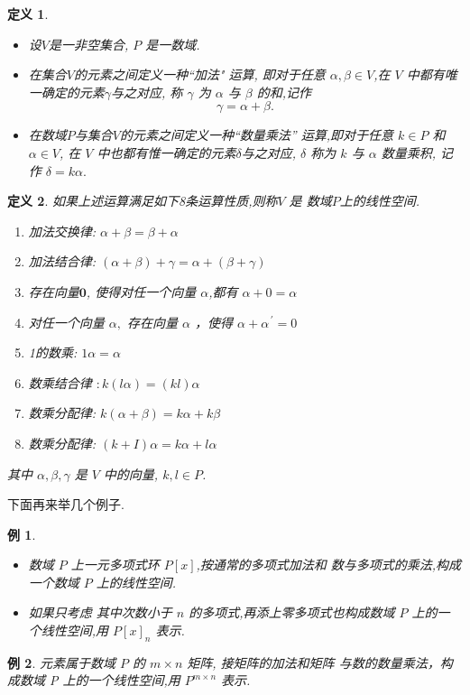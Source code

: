 \documentclass[13pt]{beamer}
\newtheorem{exa}{例}
\newtheorem*{defi}{定义}
\def\0{\mathbf{0}}
\def\a{\alpha}
\begin{document}
\begin{frame}

\begin{defi}
\begin{itemize}
\item 设$V$是一非空集合, $P$ 是一数域.
\item 在集合$V$的元素之间定义一种“\alert{加法}" 运算, 即对于任意 $\alpha, \beta \in V$,在 $V$ 中都有唯一确定的元素$\gamma$与之对应, 称 $\gamma$ 为 $\alpha$ 与 $\beta$ 的和,记作
\[
\gamma=\alpha+\beta.
\]

\item 在数域$P$与集合$V$的元素之间定义一种``\alert{数量乘法}'' 运算,即对于任意 $k \in P$ 和 $\a \in V$, 在 $V$ 中也都有惟一确定的元素$\delta$与之对应, $\delta$ 称为 $k$ 与 $\alpha$ 数量乘积, 记作 $\delta={k} \alpha.$
\end{itemize}
\end{defi}
\end{frame}


\begin{frame}
\begin{defi}

如果上述运算满足如下8条运算性质,则称$V$ 是 数域$P$上的\alert{线性空间}.	
\begin{enumerate}
	\item 加法交换律: $\alpha+\beta=\beta+\alpha$
	\item 加法结合律: $(\alpha+\beta)+\gamma=\alpha+(\beta+\gamma)$
	\item 存在向量$\0$, 使得对任一个向量 $\alpha$,都有 $\alpha+{0}=\alpha$
	\item 对任一个向量 $\alpha,$ 存在向量 $\alpha$ ，使得 $\alpha+\alpha^{\, \prime}={0}$
	\item 1的数乘: $1 \alpha=\alpha$
	\item 数乘结合律 $: k(l \alpha)=(k l) \alpha$
	\item 数乘分配律: $k(\alpha+\beta)=k \alpha+k \beta$
	\item 数乘分配律: $({k}+I) \alpha={k} \alpha+l \alpha$
\end{enumerate}
其中 $\alpha, \beta, \gamma$ 是 $V$ 中的向量, $k, l \in {P}$.
\end{defi}

\end{frame}

\begin{frame}
下面再来举几个例子. 
\begin{exa}
\begin{itemize}
	\item 数域 $P$ 上一元多项式环 $P[x]$,按通常的多项式加法和 数与多项式的乘法,构成一个数域 $P$ 上的线性空间.
	\item 如果只考虑 其中\alert{次数小于 $n$} 的多项式,再添上零多项式也构成数域 $P$ 上的一 个线性空间,用 $P[x]_{n}$ 表示.
\end{itemize}
\end{exa}

\begin{exa}
元素属于数域 $P$ 的 $m \times n$ 矩阵, 接矩阵的加法和矩阵 与数的数量乘法，构成数域 P 上的一个线性空间,用 $P^{m \times n}$ 表示. 
\end{exa}
\end{frame}
\end{document}
